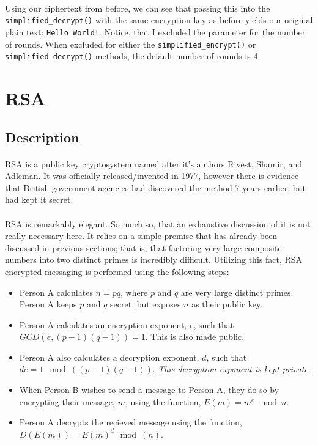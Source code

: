 \documentclass[12pt,a4paper]{article}
\begin{document}
\paragraph{}
Using our ciphertext from before, we can see that passing this into the 
\verb|simplified_decrypt()| with the same encryption key as before yields 
our original plain text: \verb|Hello World!|.  Notice, that I excluded the 
parameter for the number of rounds.  When excluded for either the 
\verb|simplified_encrypt()| or \verb|simplified_decrypt()| methods, the 
default number of rounds is 4.


\section{RSA}
\subsection{Description}
\paragraph{}
RSA is a public key cryptosystem named after it's authors Rivest, Shamir, and 
Adleman.  It was officially released/invented in 1977, however there is 
evidence that British government agencies had discovered the method 7 years 
earlier, but had kept it secret.

\paragraph{}
RSA is remarkably elegant.  So much so, that an exhaustive discussion of it is 
not really necessary here.  It relies on a simple premise that has already 
been discussed in previous sections; that is, that factoring very large 
composite numbers into two distinct primes is incredibly difficult.  Utilizing 
this fact, RSA encrypted messaging is performed using the following steps:

\begin{itemize}
  \item Person A calculates $n = pq$, where $p$ and $q$ are very large distinct 
  primes.  Person A keeps $p$ and $q$ secret, but exposes $n$ as their public 
  key.
  \item Person A calculates an encryption exponent, $e$, such that 
  $GCD(e,(p-1)(q-1)) = 1$.  This is also made public.
  \item Person A also calculates a decryption exponent, $d$, such that 
  $de = 1 \mod((p-1)(q-1))$.  \textit{This decryption exponent is kept private}.
  \item When Person B wishes to send a message to Person A, they do so by 
  encrypting their message, $m$, using the function, $E(m) = m^e \mod{n}$.
  \item Person A decrypts the recieved message using the function, 
  $D(E(m)) = E(m)^d \mod(n)$.
\end{itemize}
\end{document}
